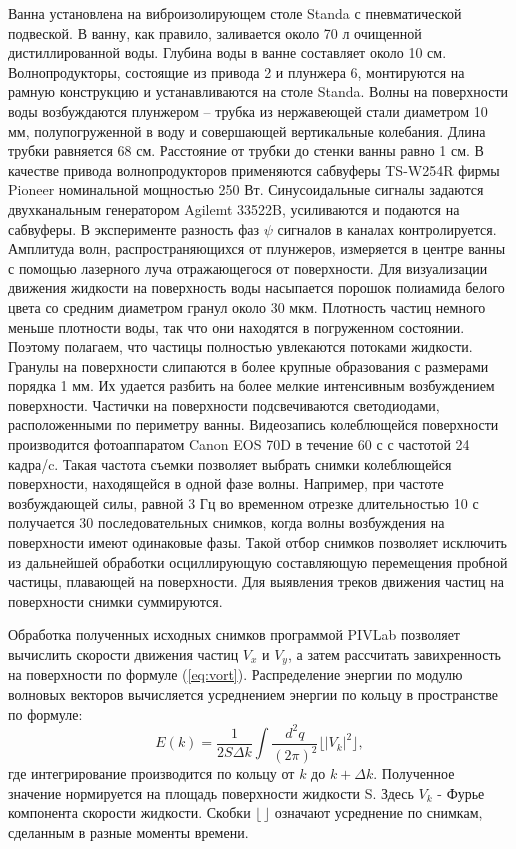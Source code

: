Ванна установлена на виброизолирующем столе Standa с пневматической подвеской. В ванну, как правило, заливается около 70 л очищенной дистиллированной воды. Глубина воды в ванне составляет около 10 см. Волнопродукторы, состоящие из привода 2 и плунжера 6, монтируются на рамную конструкцию и устанавливаются на столе Standa. Волны на поверхности воды возбуждаются плунжером – трубка из нержавеющей стали диаметром 10 мм, полупогруженной в воду и совершающей вертикальные колебания. Длина трубки равняется 68 см. Расстояние от трубки до стенки ванны равно 1 см. В качестве привода волнопродукторов применяются сабвуферы TS-W254R фирмы Pioneer номинальной мощностью 250 Вт. Синусоидальные сигналы задаются двухканальным генератором Agilemt 33522B, усиливаются и подаются на сабвуферы. В эксперименте разность фаз $\psi$ сигналов в каналах контролируется. Амплитуда волн, распространяющихся от плунжеров, измеряется в центре ванны с помощью лазерного луча отражающегося от поверхности. Для визуализации движения жидкости на поверхность воды насыпается порошок полиамида белого цвета со средним диаметром гранул около 30 мкм. Плотность частиц немного меньше плотности воды, так что они находятся в погруженном состоянии. Поэтому полагаем, что частицы полностью увлекаются потоками жидкости. Гранулы на поверхности слипаются в более крупные образования с размерами порядка 1 мм. Их удается разбить на более мелкие интенсивным возбуждением поверхности. Частички на поверхности подсвечиваются светодиодами, расположенными по периметру ванны. Видеозапись колеблющейся поверхности производится фотоаппаратом Canon EOS 70D в течение 60 с с частотой 24 кадра/c. Такая частота съемки позволяет выбрать снимки колеблющейся поверхности, находящейся в одной фазе волны. Например, при частоте возбуждающей силы, равной 3 Гц во временном отрезке длительностью 10 с получается 30 последовательных снимков, когда волны возбуждения на поверхности имеют одинаковые фазы. Такой отбор снимков позволяет исключить из дальнейшей обработки осциллирующую составляющую перемещения пробной частицы, плавающей на поверхности. Для выявления треков движения частиц на поверхности снимки суммируются.

Обработка полученных исходных снимков программой PIVLab \cite{piv} позволяет вычислить скорости движения частиц $V_x$ и $V_y$, а затем рассчитать завихренность на поверхности по формуле (\ref{eq:vort}). Распределение энергии по модулю волновых векторов вычисляется усреднением энергии по кольцу в пространстве по формуле:
\begin{equation}
E(k) = \frac{1}{ 2 S \Delta k}\int \frac{d^2 q}{(2 \pi)^2} \lfloor |V_k|^2 \rfloor,
\end{equation}
где интегрирование производится по кольцу от ${k}$ до ${k} + \Delta{k}$. Полученное значение нормируется на площадь поверхности жидкости S. Здесь $V_k$ - Фурье компонента скорости жидкости. Скобки $\lfloor \, \rfloor$ означают усреднение по снимкам, сделанным в разные моменты времени.
	
